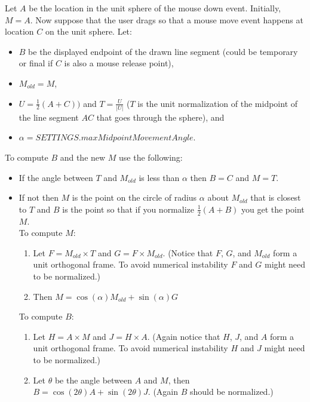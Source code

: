 \documentclass[crop,tikz]{article}
\begin{document}
Let $A$ be the location in the unit sphere of the mouse down event. Initially, $M = A$. Now suppose that the user drags so that a mouse move event happens at location $C$ on the unit sphere. Let:
\begin{itemize} 
    \item $B$ be the displayed endpoint of the drawn line segment (could be temporary or final if $C$ is also a mouse release point), 
    \item $M_{old} = M$, 
    \item $U = \frac{1}{2}(A+C))$ and $T= \frac{U}{|U|}$ ($T$ is the unit normalization of the midpoint of the line segment $AC$ that goes through the sphere), and
    \item  $\alpha = SETTINGS.maxMidpointMovementAngle$. 
\end{itemize}
To compute $B$ and the new $M$ use the following:
\begin{itemize}
    \item If the angle between $T$ and $M_{old}$ is less than $\alpha$ then $B = C$ and $M = T$.
    \item If not then $M$ is the point on the circle of radius $\alpha$ about $M_{old}$ that is closest to $T$ and $B$ is the point so that if you normalize $\frac{1}{2} (A+B)$ you get the point $M$.\\ To compute $M$:
    \begin{enumerate}
        \item Let $F = M_{old} \times T$ and $G= F \times M_{old}$. (Notice that $F$, $G$, and $M_{old}$ form a unit orthogonal frame. To avoid numerical instability $F$ and $G$ might need to be normalized.)
        \item Then $M = \cos(\alpha)M_{old} + \sin(\alpha)G$
      \end{enumerate}
      To compute $B$:
      \begin{enumerate}
          \item Let $H= A \times M$ and $J = H \times A$. (Again notice that $H$, $J$, and $A$ form a unit orthogonal frame. To avoid numerical instability $H$ and $J$ might need to be normalized.)
          \item Let $\theta$ be the angle between $A$ and $M$, then $B = \cos(2\theta)A + \sin(2\theta)J$. (Again $B$ should be normalized.)
      \end{enumerate}
  \end{itemize}

  
\end{document}

